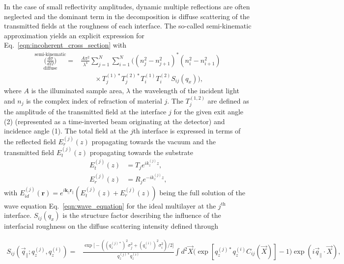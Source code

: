 In the case of small reflectivity amplitudes, dynamic multiple reflections are often neglected and the dominant term in the decomposition is diffuse scattering of the transmitted fields at the roughness of each interface. The so-called semi-kinematic approximation \cite{PhysRevB.38.2297} yields an explicit expression for Eq.~\eqref{eqn:incoherent_cross_section} with
\begin{align}
                \overset{\text{semi-kinematic}}{\underset{\text{diffuse}}{\Big(\frac{d \sigma}{d \Omega}\Big)}} = &\frac{A \pi^2}{\lambda^4}\sum \limits_{j=1}^{N}\sum \limits_{i=1}^{N} \Big((n_j^2 - n_{j+1}^2)^* (n_i^2 - n_{i+1}^2) \nonumber \\ &\qquad\times T^{(1)*}_j T^{(2)*}_j T^{(1)}_i T^{(2)}_i S_{i j}(q_x)\Big)\text{,} \label{eqn:semi_kinematic_theory} 
\end{align}
where $A$ is the illuminated sample area, $\lambda$ the wavelength of the incident light and $n_j$ is the complex index of refraction of material $j$. The $T^{(1,2)}_j$ are defined as the amplitude of the transmitted field at the interface $j$ for the given exit angle (2) (represented as a time-inverted beam originating at the detector) and incidence angle (1). The total field at the $j$th interface is expressed in terms of the reflected field $E_r^{(j)}(z)$ propagating towards the vacuum and the transmitted field $E_t^{(j)}(z)$ propagating towards the substrate
\begin{align}
        E_t^{(j)}(z) &= T_{j} e^{i k_z^{(j)} z} \text{,} \\
        E_r^{(j)}(z) &= R_{j} e^{-i k_z^{(j)} z} \text{,} 
\end{align}
with $E_{id}^{(j)}(\mathbf{r}) = e^{i \mathbf{k_\parallel r_\parallel}} (E_t^{(j)}(z) + E_r^{(j)}(z))$ being the full solution of the wave equation Eq.~\eqref{eqn:wave_equation} for the ideal multilayer at the $j^\text{th}$ interface. $S_{ij}(q_x)$ is the structure factor describing the influence of the interfacial roughness on the diffuse scattering intensity defined through

\begin{align}
S_{ij}(\vec{q}_\parallel; q_z^{(j)}, q_z^{(i)}) = &\frac{\exp \Big[-((q_z^{(j)*})^{2} \sigma_j^2 + (q_z^{(i)})^{2} \sigma_i^2)/2\Big]}{q_z^{(j)*} q_z^{(i)}} \int d^2 \vec{X} \Big(\exp [q_z^{(j)*} q_z^{(i)} C_{ij}(\vec{X})]-1\Big) \exp(i \vec{q}_\parallel \cdot \vec{X}) \text{,} \label{eqn:full_structure_factor}
\end{align}

